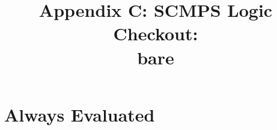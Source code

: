 \documentclass[10pt, oneside]{book}
\title{Appendix C: SCMPS Logic Checkout:\\bare}
\date{}
\begin{document}
\maketitle
\addtocounter{page}{1}
\newpage
\chapter{Always Evaluated}
\end{document}

